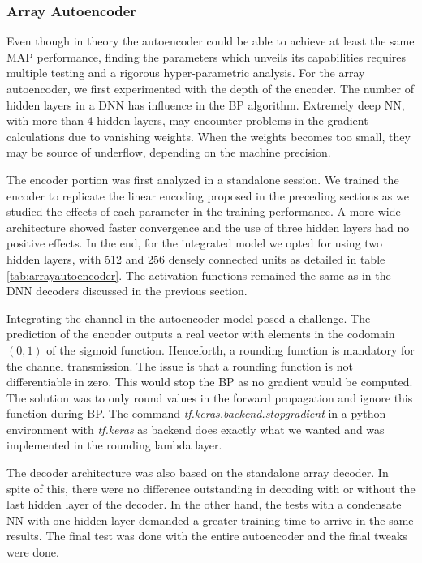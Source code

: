 \documentclass[conference]{IEEEtran}
\begin{document}
\subsubsection{Array Autoencoder}

Even though in theory the autoencoder could be able to achieve at least the same MAP performance, finding the parameters which unveils its capabilities requires multiple testing and a rigorous hyper-parametric analysis. For the array autoencoder, we first experimented with the depth of the encoder. The number of hidden layers in a DNN has influence in the BP algorithm. Extremely deep NN, with more than 4 hidden layers, may encounter problems in the gradient calculations due to vanishing weights. When the weights becomes too small, they may be source of underflow, depending on the machine precision. 

The encoder portion was first analyzed in a standalone session. We trained the encoder to replicate the linear encoding proposed in the preceding sections as we studied the effects of each parameter in the training performance. A more wide architecture showed faster convergence and the use of three hidden layers had no positive effects. In the end, for the integrated model we opted for using two hidden layers, with 512 and 256 densely connected units as detailed in table \ref{tab:arrayautoencoder}. The activation functions remained the same as in the DNN decoders discussed in the previous section.

Integrating the channel in the autoencoder model posed a challenge.  The prediction of the encoder outputs a real vector with elements in the codomain $(0,1)$ of the sigmoid function. Henceforth, a rounding function is mandatory for the channel transmission. The issue is that a rounding function is not differentiable in zero. This would stop the BP as no gradient would be computed. The solution was to only round values in the forward propagation and ignore this function during BP. The command \textit{tf.keras.backend.stop\textunderscore gradient} in a python environment with \textit{tf.keras} as backend does exactly what we wanted and was implemented in the rounding lambda layer. 

The decoder architecture was also based on the standalone array decoder. In spite of this, there were no difference outstanding in decoding with or without the last hidden layer of the decoder. In the other hand, the tests with a condensate NN with one hidden layer demanded a greater training time to arrive in the same results. The final test was done with the entire autoencoder and the final tweaks were done.
\end{document}
